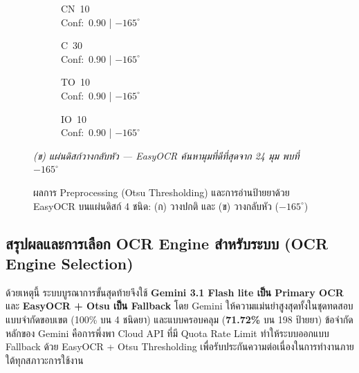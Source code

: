 \begin{figure}[H]
  \vspace{8pt}
  \begin{subfigure}[b]{0.23\textwidth}
    \centering
    \caption*{CN~10\\Conf:~0.90 | $-165^\circ$}
  \end{subfigure}\hfill
  \begin{subfigure}[b]{0.23\textwidth}
    \centering
    \caption*{C~30\\Conf:~0.90 | $-165^\circ$}
  \end{subfigure}\hfill
  \begin{subfigure}[b]{0.23\textwidth}
    \centering
    \caption*{TO~10\\Conf:~0.90 | $-165^\circ$}
  \end{subfigure}\hfill
  \begin{subfigure}[b]{0.23\textwidth}
    \centering
    \caption*{IO~10\\Conf:~0.90 | $-165^\circ$}
  \end{subfigure}

  \vspace{6pt}
  \begin{center}\small\textit{(ข) แผ่นดิสก์วางกลับหัว — EasyOCR ค้นหามุมที่ดีที่สุดจาก 24 มุม พบที่ $-165^\circ$}\end{center}

  \caption{ผลการ Preprocessing (Otsu Thresholding) และการอ่านป้ายยาด้วย EasyOCR บนแผ่นดิสก์ 4 ชนิด: (ก) วางปกติ และ (ข) วางกลับหัว ($-165^\circ$)}
  \label{fig:ocr_preprocess_grid}
\end{figure}

\subsection{สรุปผลและการเลือก OCR Engine สำหรับระบบ (OCR Engine Selection)}

ด้วยเหตุนี้ ระบบบูรณาการขั้นสุดท้ายจึงใช้ \textbf{Gemini 3.1 Flash lite เป็น Primary OCR} และ \textbf{EasyOCR + Otsu เป็น Fallback} โดย Gemini ให้ความแม่นยำสูงสุดทั้งในชุดทดสอบแบบจำกัดขอบเขต (100\% บน 4 ชนิดยา) และแบบครอบคลุม (\textbf{71.72\%} บน 198 ป้ายยา) ข้อจำกัดหลักของ Gemini คือการพึ่งพา Cloud API ที่มี Quota Rate Limit ทำให้ระบบออกแบบ Fallback ด้วย EasyOCR + Otsu Thresholding เพื่อรับประกันความต่อเนื่องในการทำงานภายใต้ทุกสภาวะการใช้งาน

